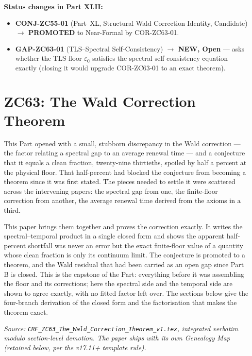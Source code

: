 \documentclass[12pt, a4paper]{article}
\begin{document}
\medskip
\textbf{Status changes in Part XLII:}
\begin{itemize}[leftmargin=1.5em]
\item \textbf{CONJ-ZC55-01} (Part~XL, Structural Wald Correction Identity,
  Candidate) $\to$ \textbf{PROMOTED} to Near-Formal by COR-ZC63-01.
\item \textbf{GAP-ZC63-01} (TLS--Spectral Self-Consistency) $\to$
  \textbf{NEW, Open} --- asks whether the TLS floor $\varepsilon_0$
  satisfies the spectral self-consistency equation exactly (closing it
  would upgrade COR-ZC63-01 to an exact theorem).
\end{itemize}

\bigskip

\section{ZC63: The Wald Correction Theorem}

This Part opened with a small, stubborn discrepancy in the Wald correction ---
the factor relating a spectral gap to an average renewal time --- and a
conjecture that it equals a clean fraction, twenty-nine thirtieths, spoiled by
half a percent at the physical floor. That half-percent had blocked the
conjecture from becoming a theorem since it was first stated. The pieces needed
to settle it were scattered across the intervening papers: the spectral gap from
one, the finite-floor correction from another, the average renewal time derived
from the axioms in a third.

This paper brings them together and proves the correction exactly. It writes
the spectral--temporal product in a single closed form and shows the apparent
half-percent shortfall was never an error but the exact finite-floor value of a
quantity whose clean fraction is only its continuum limit. The conjecture is
promoted to a theorem, and the Wald residual that had been carried as an open
gap since Part B is closed. This is the capstone of the Part: everything before
it was assembling the floor and its corrections; here the spectral side and the
temporal side are shown to agree exactly, with no fitted factor left over. The
sections below give the four-branch derivation of the closed form and the
factorisation that makes the theorem exact.
\label{sec:zc63}

\noindent
\textit{Source: \texttt{CRF\_ZC63\_The\_Wald\_Correction\_Theorem\_v1.tex},
integrated verbatim modulo section-level demotion. The paper ships with
its own Genealogy Map (retained below, per the v17.11+ template rule).}
\end{document}
